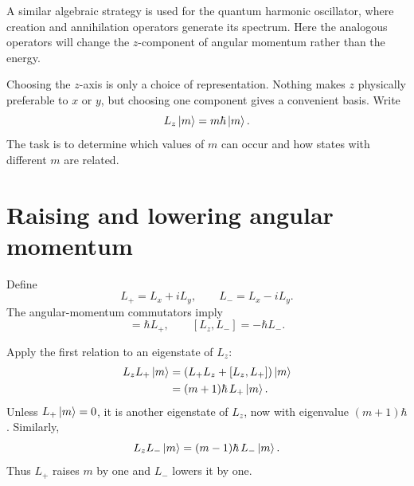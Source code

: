 A similar algebraic strategy is used for the quantum harmonic oscillator, where creation and annihilation operators generate its spectrum. Here the analogous operators will change the \(z\)-component of angular momentum rather than the energy.

Choosing the \(z\)-axis is only a choice of representation. Nothing makes \(z\) physically preferable to \(x\) or \(y\), but choosing one component gives a convenient basis. Write
\begin{equation}
L_z\left\lvert m\right\rangle=m\hbar\left\lvert m\right\rangle.
\end{equation}
The task is to determine which values of \(m\) can occur and how states with different \(m\) are related.

\begin{classroomqa}
\end{classroomqa}

\section{Raising and lowering angular momentum}

Define
\begin{equation}
L_+=L_x+iL_y,
\qquad
L_-=L_x-iL_y.
\end{equation}
The angular-momentum commutators imply
\begin{equation}
[L_z,L_+]=\hbar L_+,
\qquad
[L_z,L_-]=-\hbar L_-.
\end{equation}

Apply the first relation to an eigenstate of \(L_z\):
\begin{align}
L_zL_+\left\lvert m\right\rangle
&=\left(L_+L_z+[L_z,L_+]\right)\left\lvert m\right\rangle\\
&=(m+1)\hbar\,L_+\left\lvert m\right\rangle.
\end{align}
Unless \(L_+\left\lvert m\right\rangle=0\), it is another eigenstate of \(L_z\), now with eigenvalue \((m+1)\hbar\). Similarly,
\begin{equation}
L_zL_-\left\lvert m\right\rangle
=(m-1)\hbar\,L_-\left\lvert m\right\rangle.
\end{equation}
Thus \(L_+\) raises \(m\) by one and \(L_-\) lowers it by one.

